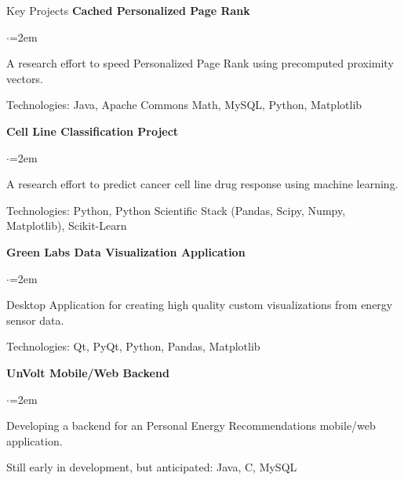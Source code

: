 \documentclass{resume} %
\begin{document}
\begin{rSection}{Key Projects}
{\bf Cached Personalized Page Rank}
\begin{list}{$\cdot$}{\leftmargin=2em}
\vspace{-.5em}
\item A research effort to speed Personalized Page Rank using precomputed proximity vectors.
\vspace{-.5em}
\item Technologies: Java, Apache Commons Math, MySQL, Python, Matplotlib
\vspace{-.5em}
\end{list}

{\bf Cell Line Classification Project}
\begin{list}{$\cdot$}{\leftmargin=2em}
\vspace{-.5em}
\item A research effort to predict cancer cell line drug response using machine learning.
\vspace{-.5em}
\item Technologies: Python, Python Scientific Stack (Pandas, Scipy, Numpy, Matplotlib), Scikit-Learn
\vspace{-.5em}
\end{list}

{\bf Green Labs Data Visualization Application}

\begin{list}{$\cdot$}{\leftmargin=2em}
\vspace{-.5em}
\item Desktop Application for creating high quality custom visualizations from energy sensor data.
\vspace{-.5em}
\item Technologies: Qt, PyQt, Python, Pandas, Matplotlib
\vspace{-.5em}
\end{list}

{\bf UnVolt Mobile/Web Backend}
\begin{list}{$\cdot$}{\leftmargin=2em}
\vspace{-.5em}
\item Developing a backend for an Personal Energy Recommendations mobile/web application.
\vspace{-.5em}
\item Still early in development, but anticipated: Java, C, MySQL
\vspace{-.5em}
\end{list}
\end{rSection}
\end{document}
